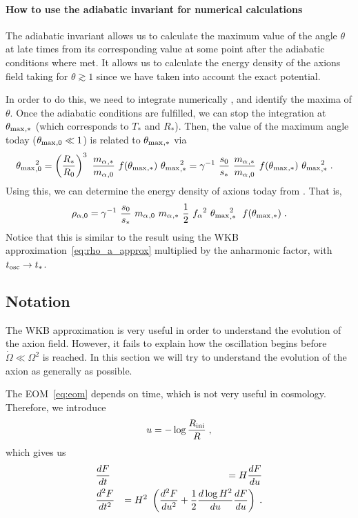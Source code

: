 \documentclass[11pt,a4paper]{article}
\begin{document}
\paragraph{How to use the adiabatic invariant for numerical calculations}
%
The adiabatic invariant allows us to calculate the maximum value of the angle $\theta$ at late times from its corresponding value at some point after the adiabatic conditions where met. It allows us to calculate the energy density of the axions field taking for $\theta \gtrsim 1$ since we have taken into account the exact potential.


In order to do this, we need to integrate numerically , and identify the maxima of $\theta$. Once the adiabatic conditions are fulfilled, we can stop the integration at $\theta_{\rm max}{}_{,*}$ (which corresponds to $T_{*}$ and $R_{*}$). Then, the value of the maximum angle today ($\theta_{\rm max}{}_{,0} \ll 1$) is related to $\theta_{\rm max}{}_{,*}$ via
%
\begin{eqnarray}
	\thetamax_{,0}^2 &=  \lrb{\dfrac{R_*}{R_0}}^3 \ \dfrac{\ma_{,*}}{\ma_{,0}} \ f(\thetamax_{,*}) \ \thetamax_{,*}^2  =
	\gamma^{-1} \ \dfrac{s_0}{s_*} \ \dfrac{\ma_{,*}}{\ma_{,0}} \ f(\thetamax_{,*}) \ \thetamax_{,*}^2 
	\; .
	\label{eq:theta_relation}
\end{eqnarray}
%
Using this, we can determine the energy density of axions today  from . That is,
%
\begin{equation}
	\rho_{\alpha,0} = \gamma^{-1} \ \dfrac{s_0}{s_*} \ \ma_{,0} \ \ma_{,*} \ \dfrac{1}{2} \ \fa^2 \ \thetamax_{,*}^2 \;  \ f(\thetamax_{,*}) \;.
	\label{eq:rho_axion_exact}
\end{equation}
%
Notice that this is similar to the result using the WKB approximation~\ref{eq:rho_a_approx} multiplied by the anharmonic factor, with $t_{\rm osc}{} \to t_*$.


\subsection{Notation}\label{sec:beyond_WKB}
%
The WKB approximation is very useful in order to understand the evolution of the axion field. However, it fails to explain how the oscillation begins before $\dot \Omega \ll \Omega^2$ is reached. In this section we will try to understand the evolution of the axion as generally as possible. 


%
The EOM~\ref{eq:eom} depends on time, which is not very useful in cosmology. Therefore, we introduce 
%
\begin{eqnarray}
	u = -\log \dfrac{R_{\rm ini}{}}{R} \;,
	\label{eq:natation}
\end{eqnarray}
%
which gives us 
%
\begin{eqnarray}
	&\dfrac{d F}{dt} &=  H  \dfrac{d F}{du} 
	\nonumber \\
	&\dfrac{d^2 F}{dt^2} &= H^2 \ \left(  \dfrac{d^2 F}{du^2} + \dfrac{1}{2} \dfrac{d \log H^2}{du}  \dfrac{d F}{du}  \right)\;.
	\label{eq:deriv_u}
\end{eqnarray}
\end{document}
